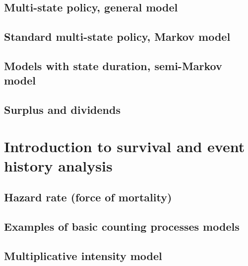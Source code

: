 \documentclass[a4paper,12pt,openany]{book}
\begin{document}
\hypertarget{multi-state-policy-general-model}{%
\subsection{Multi-state policy, general model}\label{multi-state-policy-general-model}}

\hypertarget{standard-multi-state-policy-markov-model}{%
\subsection{Standard multi-state policy, Markov model}\label{standard-multi-state-policy-markov-model}}

\hypertarget{models-with-state-duration-semi-markov-model}{%
\subsection{Models with state duration, semi-Markov model}\label{models-with-state-duration-semi-markov-model}}

\hypertarget{surplus-and-dividends}{%
\subsection{Surplus and dividends}\label{surplus-and-dividends}}

\hypertarget{introduction-to-survival-and-event-history-analysis}{%
\section{Introduction to survival and event history analysis}\label{introduction-to-survival-and-event-history-analysis}}

\hypertarget{hazard-rate-force-of-mortality}{%
\subsection{Hazard rate (force of mortality)}\label{hazard-rate-force-of-mortality}}

\hypertarget{examples-of-basic-counting-processes-models}{%
\subsection{Examples of basic counting processes models}\label{examples-of-basic-counting-processes-models}}

\hypertarget{multiplicative-intensity-model}{%
\subsection{Multiplicative intensity model}\label{multiplicative-intensity-model}}
\end{document}
